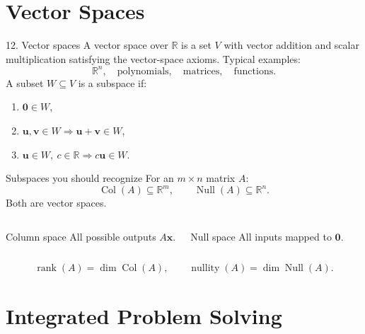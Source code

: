 \documentclass[aspectratio=169,11pt]{beamer}
\newcommand{\R}{\mathbb{R}}
\newcommand{\vect}[1]{\bm{#1}}
\begin{document}
\section{Vector Spaces}
\begin{frame}{12. Vector spaces}
A vector space over $\R$ is a set $V$ with vector addition and scalar multiplication satisfying the vector-space axioms.
Typical examples:
\[
\R^n,\quad
\text{polynomials},\quad
\text{matrices},\quad
\text{functions}.
\]
A subset $W\subseteq V$ is a subspace if:
\begin{enumerate}
\item $\vect0\in W$,
\item $\vect u,\vect v\in W\Rightarrow\vect u+\vect v\in W$,
\item $\vect u\in W,\ c\in\R\Rightarrow c\vect u\in W$.
\end{enumerate}
\end{frame}

\begin{frame}{Subspaces you should recognize}
For an $m\times n$ matrix $A$:
\[
\operatorname{Col}(A)\subseteq\R^m,\qquad
\operatorname{Null}(A)\subseteq\R^n.
\]
Both are vector spaces.
\begin{columns}[T]
\begin{block}{Column space}
All possible outputs $A\vect x$.
\end{block}
\begin{block}{Null space}
All inputs mapped to $\vect0$.
\end{block}
\end{columns}
\vspace{.2cm}
\[
\operatorname{rank}(A)=\dim\operatorname{Col}(A),\qquad
\operatorname{nullity}(A)=\dim\operatorname{Null}(A).
\]
\end{frame}

\section{Integrated Problem Solving}
\end{document}
